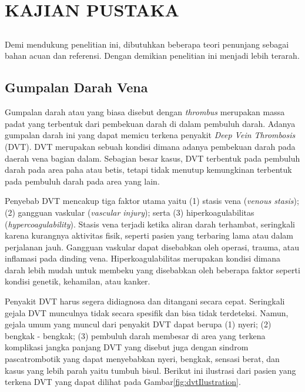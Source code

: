 \chapter{KAJIAN PUSTAKA}


\section*{ }
Demi mendukung penelitian ini, dibutuhkan beberapa teori penunjang sebagai bahan acuan dan referensi. Dengan demikian penelitian ini menjadi lebih terarah. 
\vspace{1ex}

\section{Gumpalan Darah Vena}

Gumpalan darah atau yang biasa disebut dengan \textit{thrombus} merupakan massa padat yang terbentuk dari pembekuan darah di dalam pembuluh darah\cite{ashorobi2022thrombosis}. Adanya gumpalan darah ini yang dapat memicu terkena penyakit \textit{ Deep Vein Thrombosis} (DVT). DVT merupakan sebuah kondisi dimana adanya pembekuan darah pada daerah vena bagian dalam. Sebagian besar kasus, DVT terbentuk pada pembuluh darah pada area paha atau betis, tetapi tidak menutup kemungkinan terbentuk pada pembuluh darah pada area yang lain. 

Penyebab DVT mencakup tiga faktor utama yaitu (1) stasis vena (\textit{venous stasis}); (2) gangguan vaskular (\textit{vascular injury}); serta (3) hiperkoagulabilitas (\textit{hypercoagulability})\cite{Jonathan2017}. Stasis vena terjadi ketika aliran darah terhambat, seringkali karena kurangnya aktivitas fisik, seperti pasien yang terbaring lama atau dalam perjalanan jauh. Gangguan vaskular dapat disebabkan oleh operasi, trauma, atau inflamasi pada dinding vena. Hiperkoagulabilitas merupakan kondisi dimana darah lebih mudah untuk membeku yang disebabkan oleh beberapa faktor seperti kondisi genetik, kehamilan, atau kanker.   

Penyakit DVT harus segera didiagnosa dan ditangani secara cepat. Seringkali gejala DVT munculnya tidak secara spesifik dan bisa tidak terdeteksi. Namun, gejala umum yang muncul dari penyakit DVT dapat berupa (1) nyeri; (2) bengkak - bengkak; (3) pembuluh darah membesar di area yang terkena komplikasi jangka panjang DVT yang disebut juga dengan sindrom pascatrombotik yang dapat menyebabkan nyeri, bengkak, sensasi berat, dan kasus yang lebih parah yaitu tumbuh bisul. Berikut ini ilustrasi dari pasien yang terkena DVT yang dapat dilihat pada Gambar\ref{fig:dvtIlustration}.


